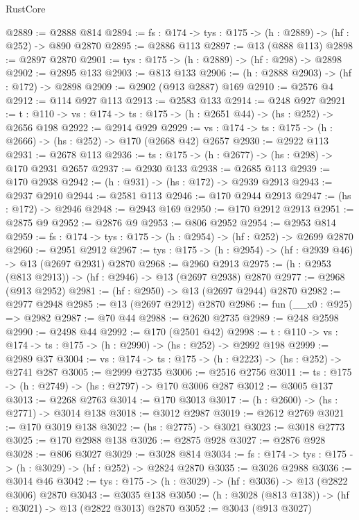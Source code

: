 \begin{lexlean}{RustCore}
\begin{coremodule}
@2889 := @2888 @814
@2894 := {fs : @174} -> {tys : @175} -> (h : @2889) -> (hf : @252) -> @890 @2870
@2895 := @2886 @113
@2897 := @13 (@888 @113)
@2898 := @2897 @2870
@2901 := {tys : @175} -> (h : @2889) -> (hf : @298) -> @2898
@2902 := @2895 @133
@2903 := @813 @133
@2906 := (h : @2888 @2903) -> (hf : @172) -> @2898
@2909 := @2902 (@913 @2887) @169
@2910 := @2576 @4
@2912 := @114 @927 @113
@2913 := @2583 @133
@2914 := @248 @927
@2921 := {t : @110} -> {vs : @174} -> {ts : @175} -> (h : @2651 @44) -> (hs : @252) -> @2656 @198
@2922 := @2914 @929
@2929 := {vs : @174} -> {ts : @175} -> (h : @2666) -> (hs : @252) -> @170 (@2668 @42) @2657
@2930 := @2922 @113
@2931 := @2678 @113
@2936 := {ts : @175} -> (h : @2677) -> (hs : @298) -> @170 @2931 @2657
@2937 := @2930 @133
@2938 := @2685 @113
@2939 := @170 @2938
@2942 := (h : @931) -> (hs : @172) -> @2939 @2913
@2943 := @2937 @2910
@2944 := @2581 @113
@2946 := @170 @2944 @2913
@2947 := (hs : @172) -> @2946
@2948 := @2943 @169
@2950 := @170 @2912 @2913
@2951 := @2875 @9
@2952 := @2876 @9
@2953 := @806 @2952
@2954 := @2953 @814
@2959 := {fs : @174} -> {tys : @175} -> (h : @2954) -> (hf : @252) -> @2699 @2870
@2960 := @2951 @2912
@2967 := {tys : @175} -> (h : @2954) -> (hf : @2939 @46) -> @13 (@2697 @2931) @2870
@2968 := @2960 @2913
@2975 := (h : @2953 (@813 @2913)) -> (hf : @2946) -> @13 (@2697 @2938) @2870
@2977 := @2968 (@913 @2952)
@2981 := (hf : @2950) -> @13 (@2697 @2944) @2870
@2982 := @2977 @2948
@2985 := @13 (@2697 @2912) @2870
@2986 := fun (__x0 : @925) => @2982
@2987 := @70 @44
@2988 := @2620 @2735
@2989 := @248 @2598
@2990 := @2498 @44
@2992 := @170 (@2501 @42)
@2998 := {t : @110} -> {vs : @174} -> {ts : @175} -> (h : @2990) -> (hs : @252) -> @2992 @198
@2999 := @2989 @37
@3004 := {vs : @174} -> {ts : @175} -> (h : @2223) -> (hs : @252) -> @2741 @287
@3005 := @2999 @2735
@3006 := @2516 @2756
@3011 := {ts : @175} -> (h : @2749) -> (hs : @2797) -> @170 @3006 @287
@3012 := @3005 @137
@3013 := @2268 @2763
@3014 := @170 @3013
@3017 := (h : @2600) -> (hs : @2771) -> @3014 @138
@3018 := @3012 @2987
@3019 := @2612 @2769
@3021 := @170 @3019 @138
@3022 := (hs : @2775) -> @3021
@3023 := @3018 @2773
@3025 := @170 @2988 @138
@3026 := @2875 @928
@3027 := @2876 @928
@3028 := @806 @3027
@3029 := @3028 @814
@3034 := {fs : @174} -> {tys : @175} -> (h : @3029) -> (hf : @252) -> @2824 @2870
@3035 := @3026 @2988
@3036 := @3014 @46
@3042 := {tys : @175} -> (h : @3029) -> (hf : @3036) -> @13 (@2822 @3006) @2870
@3043 := @3035 @138
@3050 := (h : @3028 (@813 @138)) -> (hf : @3021) -> @13 (@2822 @3013) @2870
@3052 := @3043 (@913 @3027)

\end{coremodule}
\end{lexlean}
